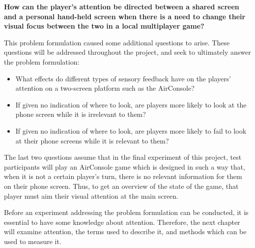 \begin{changemargin}{1cm}{1cm}
\textbf{How can the player’s attention be directed between a shared screen and a personal hand-held screen when there is a need to change their visual focus between the two in a local multiplayer game?}
\end{changemargin}

This problem formulation caused some additional questions to arise. These questions will be addressed throughout the project, and seek to ultimately answer the problem formulation:
\begin{itemize}
\item What effects do different types of sensory feedback have on the players' attention on a two-screen platform such as the AirConsole?
\item If given no indication of where to look, are players more likely to look at the phone screen while it is irrelevant to them?
\item If given no indication of where to look, are players more likely to fail to look at their phone screens while it is relevant to them?
\end{itemize}

The last two questions assume that in the final experiment of this project, test participants will play an AirConsole game which is designed in such a way that, when it is not a certain player’s turn, there is no relevant information for them on their phone screen. Thus, to get an overview of the state of the game, that player must aim their visual attention at the main screen.

Before an experiment addressing the problem formulation can be conducted, it is essential to have some knowledge about attention. Therefore, the next chapter will examine attention, the terms used to describe it, and methods which can be used to measure it.